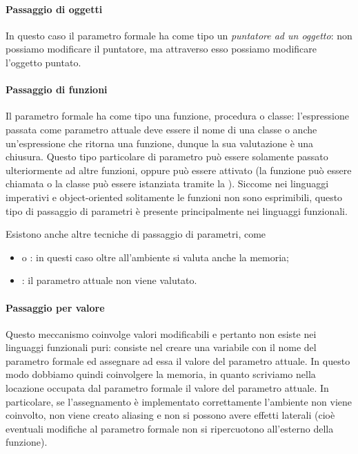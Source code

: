 \paragraph{Passaggio di oggetti} In questo caso il parametro formale ha come tipo un \emph{puntatore ad un oggetto}: non possiamo modificare il puntatore, ma attraverso esso possiamo modificare l'oggetto puntato.

\paragraph{Passaggio di funzioni} Il parametro formale ha come tipo una funzione, procedura o classe: l'espressione passata come parametro attuale deve essere il nome di una classe o anche un'espressione che ritorna una funzione, dunque la sua valutazione è una chiusura. Questo tipo particolare di parametro può essere solamente passato ulteriormente ad altre funzioni, oppure può essere attivato (la funzione può essere chiamata o la classe può essere istanziata tramite la ). Siccome nei linguaggi imperativi e object-oriented solitamente le funzioni non sono esprimibili, questo tipo di passaggio di parametri è presente principalmente nei linguaggi funzionali.

Esistono anche altre tecniche di passaggio di parametri, come \begin{itemize}
    \item {} o : in questi caso oltre all'ambiente si valuta anche la memoria;
    \item {}: il parametro attuale non viene valutato.
\end{itemize}

\paragraph{Passaggio per valore} Questo meccanismo coinvolge valori modificabili e pertanto non esiste nei linguaggi funzionali puri: consiste nel creare una variabile con il nome del parametro formale ed assegnare ad essa il valore del parametro attuale. In questo modo dobbiamo quindi coinvolgere la memoria, in quanto scriviamo nella locazione occupata dal parametro formale il valore del parametro attuale.
In particolare, se l'assegnamento è implementato correttamente l'ambiente non viene coinvolto, non viene creato aliasing e non si possono avere effetti laterali (cioè eventuali modifiche al parametro formale non si ripercuotono all'esterno della funzione).

